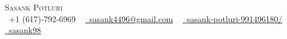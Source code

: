 \documentclass[letterpaper,10.5pt]{article}
\begin{document}

\begin{center}
    {\Huge \scshape Sasank Potluri} \\ \vspace{1pt}
    \small \raisebox{-0.1\height}\faPhone\ +1 (617)-792-6969 ~ 
    \href{mailto:sasank4496@gmail.com}{\raisebox{-0.2\height}\faEnvelope\ \underline{sasank4496@gmail.com}} ~ 
    \href{https://www.linkedin.com/in/sasank-potluri-991496180/}{\raisebox{-0.2\height}\faLinkedin\ \underline{sasank-potluri-991496180/}}  ~
    \href{https://github.com/sasank98}{\raisebox{-0.2\height}\faGithub\ \underline{sasank98}}
    \vspace{-8pt}
\end{center}


\end{document}
